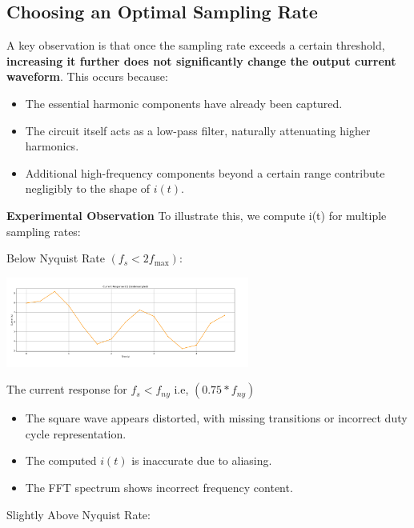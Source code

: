 \documentclass[journal]{IEEEtran}
\begin{document}
\subsection{Choosing an Optimal Sampling Rate}
A key observation is that once the sampling rate exceeds a certain threshold, \textbf{increasing it further does not significantly change the output current waveform}. This occurs because:
\begin{itemize}
    \item The essential harmonic components have already been captured.
    \item The circuit itself acts as a low-pass filter, naturally attenuating higher harmonics.
    \item Additional high-frequency components beyond a certain range contribute negligibly to the shape of $i(t)$.
\end{itemize}

 \textbf{Experimental Observation}
 To illustrate this, we compute i(t) for multiple sampling rates: \\ 
     \begin{center}
          Below Nyquist Rate $(f_s < 2 f_{\max})$: 
     \end{center}
    \captionsetup{type=figure}
    \centering
    \includegraphics[width=0.6\textwidth]{Nyquist_samples/0_75f_ny}
    \caption{The current response for  $f_s < f_{ny}$   i.e, $(0.75*f_{ny})$}
    \label{fig:example}
      \begin{itemize}
          \item The square wave appears distorted, with missing transitions or incorrect duty cycle representation.
          \item The computed $i(t)$ is inaccurate due to aliasing.
          \item The FFT spectrum shows incorrect frequency content.
      \end{itemize}
    \begin{center}  
      Slightly Above Nyquist Rate: 
    \end{center}
      
\end{document}
